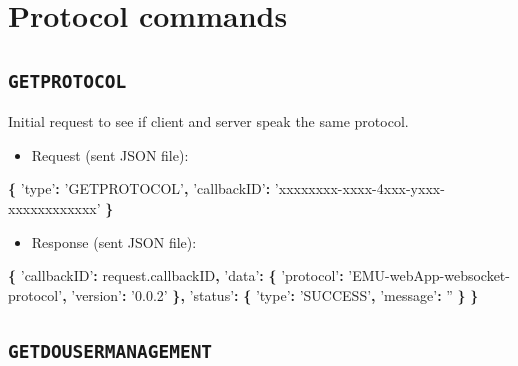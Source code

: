 \documentclass[]{book}
\newenvironment{Shaded}{\begin{snugshade}}{\end{snugshade}}
\newcommand{\AttributeTok}[1]{\textcolor[rgb]{0.77,0.63,0.00}{#1}}
\newcommand{\NormalTok}[1]{#1}
\newcommand{\OperatorTok}[1]{\textcolor[rgb]{0.81,0.36,0.00}{\textbf{#1}}}
\newcommand{\StringTok}[1]{\textcolor[rgb]{0.31,0.60,0.02}{#1}}
\newcommand{\VariableTok}[1]{\textcolor[rgb]{0.00,0.00,0.00}{#1}}
\providecommand{\tightlist}{%
  \setlength{\itemsep}{0pt}\setlength{\parskip}{0pt}}
\begin{document}
\hypertarget{protocol-commands}{%
\section{Protocol commands}\label{protocol-commands}}

\hypertarget{getprotocol}{%
\subsection{\texorpdfstring{\texttt{GETPROTOCOL}}{GETPROTOCOL}}\label{getprotocol}}

Initial request to see if client and server speak the same protocol.

\begin{itemize}
\tightlist
\item
  Request (sent JSON file):
\end{itemize}

\begin{Shaded}
\begin{Highlighting}[]
\OperatorTok{\{}
  \StringTok{'type'}\OperatorTok{:} \StringTok{'GETPROTOCOL'}\OperatorTok{,}
  \StringTok{'callbackID'}\OperatorTok{:} \StringTok{'xxxxxxxx-xxxx-4xxx-yxxx-xxxxxxxxxxxx'}
\OperatorTok{\}}
\end{Highlighting}
\end{Shaded}

\begin{itemize}
\tightlist
\item
  Response (sent JSON file):
\end{itemize}

\begin{Shaded}
\begin{Highlighting}[]
\OperatorTok{\{}
  \StringTok{'callbackID'}\OperatorTok{:} \VariableTok{request}\NormalTok{.}\AttributeTok{callbackID}\OperatorTok{,}
  \StringTok{'data'}\OperatorTok{:} \OperatorTok{\{}
    \StringTok{'protocol'}\OperatorTok{:} \StringTok{'EMU-webApp-websocket-protocol'}\OperatorTok{,}
    \StringTok{'version'}\OperatorTok{:} \StringTok{'0.0.2'}
  \OperatorTok{\},}
  \StringTok{'status'}\OperatorTok{:} \OperatorTok{\{}
    \StringTok{'type'}\OperatorTok{:} \StringTok{'SUCCESS'}\OperatorTok{,}
    \StringTok{'message'}\OperatorTok{:} \StringTok{''}
  \OperatorTok{\}}
\OperatorTok{\}}
\end{Highlighting}
\end{Shaded}

\hypertarget{getdousermanagement}{%
\subsection{\texorpdfstring{\texttt{GETDOUSERMANAGEMENT}}{GETDOUSERMANAGEMENT}}\label{getdousermanagement}}
\end{document}
